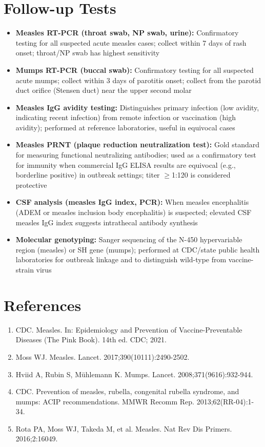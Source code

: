 \section*{Follow-up Tests}
\begin{itemize}
  \item \textbf{Measles RT-PCR (throat swab, NP swab, urine):} Confirmatory testing for all suspected acute measles cases; collect within 7 days of rash onset; throat/NP swab has highest sensitivity
  \item \textbf{Mumps RT-PCR (buccal swab):} Confirmatory testing for all suspected acute mumps; collect within 3 days of parotitis onset; collect from the parotid duct orifice (Stensen duct) near the upper second molar
  \item \textbf{Measles IgG avidity testing:} Distinguishes primary infection (low avidity, indicating recent infection) from remote infection or vaccination (high avidity); performed at reference laboratories, useful in equivocal cases
  \item \textbf{Measles PRNT (plaque reduction neutralization test):} Gold standard for measuring functional neutralizing antibodies; used as a confirmatory test for immunity when commercial IgG ELISA results are equivocal (e.g., borderline positive) in outbreak settings; titer $\geq$1:120 is considered protective
  \item \textbf{CSF analysis (measles IgG index, PCR):} When measles encephalitis (ADEM or measles inclusion body encephalitis) is suspected; elevated CSF measles IgG index suggests intrathecal antibody synthesis
  \item \textbf{Molecular genotyping:} Sanger sequencing of the N-450 hypervariable region (measles) or SH gene (mumps); performed at CDC/state public health laboratories for outbreak linkage and to distinguish wild-type from vaccine-strain virus
\end{itemize}

\section*{References}
\begin{enumerate}
  \item CDC. Measles. In: Epidemiology and Prevention of Vaccine-Preventable Diseases (The Pink Book). 14th ed. CDC; 2021.
  \item Moss WJ. Measles. Lancet. 2017;390(10111):2490-2502.
  \item Hviid A, Rubin S, Mühlemann K. Mumps. Lancet. 2008;371(9616):932-944.
  \item CDC. Prevention of measles, rubella, congenital rubella syndrome, and mumps: ACIP recommendations. MMWR Recomm Rep. 2013;62(RR-04):1-34.
  \item Rota PA, Moss WJ, Takeda M, et al. Measles. Nat Rev Dis Primers. 2016;2:16049.
\end{enumerate}

\clearpage
